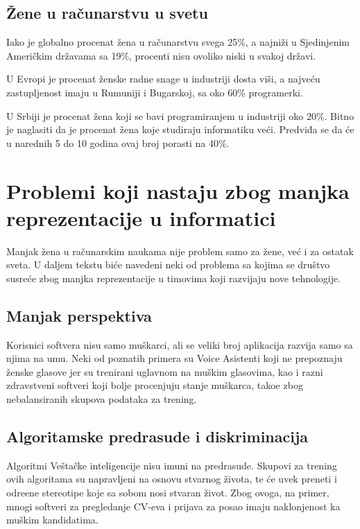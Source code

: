 \documentclass[12pt]{article}
\begin{document}
\subsection{Žene u računarstvu u svetu}

Iako je globalno procenat žena u računarstvu svega 25\%, a najniži u Sjedinjenim Američkim državama sa 19\%, procenti nisu ovoliko niski u svakoj državi.

U Evropi je procenat ženske radne snage u industriji dosta viši, a najveću zastupljenost imaju u Rumuniji i Bugarskoj, sa oko 60\% programerki. 

U Srbiji je procenat žena koji se bavi programiranjem u industriji oko 20\%. Bitno je naglasiti da je procenat žena koje studiraju informatiku veći. Predviđa se da će u narednih 5 do 10 godina ovaj broj porasti na 40\%.

\newpage

\section{Problemi koji nastaju zbog manjka reprezentacije u informatici}

Manjak žena u računarskim naukama nije problem samo za žene, već i za ostatak sveta. U daljem tekstu biće navedeni neki od problema sa kojima se društvo susreće zbog manjka reprezentacije u timovima koji razvijaju nove tehnologije.

\subsection{Manjak perspektiva}

Korisnici softvera nisu samo muškarci, ali se veliki broj aplikacija razvija samo sa njima na umu. Neki od poznatih primera su Voice Asistenti koji ne prepoznaju ženske glasove jer su trenirani uglavnom na muškim glasovima, kao i razni zdravstveni softveri koji bolje procenjuju stanje muškarca, tako\dj e zbog nebalansiranih skupova podataka za trening.

\subsection{Algoritamske predrasude i diskriminacija}

Algoritmi Veštačke inteligencije nisu imuni na predrasude. Skupovi za trening ovih algoritama su napravljeni na osnovu stvarnog života, te će uvek preneti i odre\dj ene stereotipe koje sa sobom nosi stvaran život. Zbog ovoga, na primer, mnogi softveri za pregledanje CV-eva i prijava za posao imaju naklonjenost ka muškim kandidatima.
\end{document}
